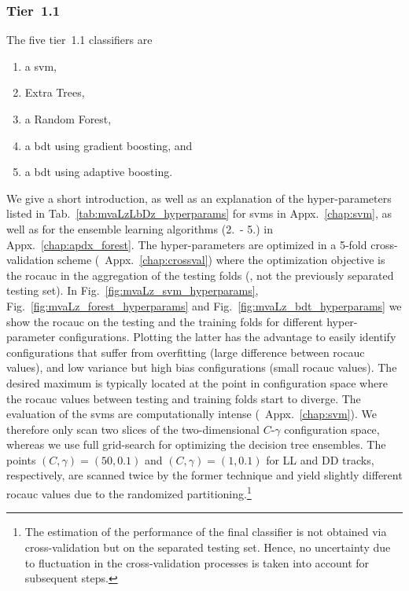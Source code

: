 \subsubsection{Tier~1.1}
The five tier~1.1 classifiers are
\begin{enumerate}[itemsep=2pt,parsep=2pt]
    \item a \gls{svm},
    \item Extra Trees,
    \item a Random Forest,
    \item a \gls{bdt} using gradient boosting, and
    \item a \gls{bdt} using adaptive boosting.
\end{enumerate}
We give a short introduction, as well as an explanation of the hyper-parameters listed in Tab.~\ref{tab:mvaLzLbDz_hyperparams} for \glspl{svm} in Appx.~\ref{chap:svm}, as well as for the ensemble learning algorithms (2.\ - 5.) in Appx.~\ref{chap:apdx_forest}.
The hyper-parameters are optimized in a 5-fold cross-validation scheme (\cf{}~Appx.~\ref{chap:crossval}) where the optimization objective is the \gls{rocauc} in the aggregation of the testing folds (\ie{}, not the previously separated testing set).
In Fig.~\ref{fig:mvaLz_svm_hyperparams}, Fig.~\ref{fig:mvaLz_forest_hyperparams} and Fig.~\ref{fig:mvaLz_bdt_hyperparams} we show the \gls{rocauc} on the testing and the training folds for different hyper-parameter configurations.
Plotting the latter has the advantage to easily identify configurations that suffer from overfitting (large difference between \gls{rocauc} values), and low variance but high bias configurations (small \gls{rocauc} values).
The desired maximum is typically located at the point in configuration space where the \gls{rocauc} values between testing and training folds start to diverge.
The evaluation of the \glspl{svm} are computationally intense (\cf{}~Appx.~\ref{chap:svm}).
We therefore only scan two slices of the two-dimensional $C$-$\gamma$ configuration space, whereas we use full grid-search for optimizing the decision tree ensembles.
The points $(C,\gamma)=(50,0.1)$ and $(C,\gamma)=(1,0.1)$ for \gls{LL} and \gls{DD} tracks, respectively, are scanned twice by the former technique and yield slightly different \gls{rocauc} values due to the randomized partitioning.\footnote{The estimation of the performance of the final classifier is not obtained via cross-validation but on the separated testing set. Hence, no uncertainty due to fluctuation in the cross-validation processes is taken into account for subsequent steps.}

